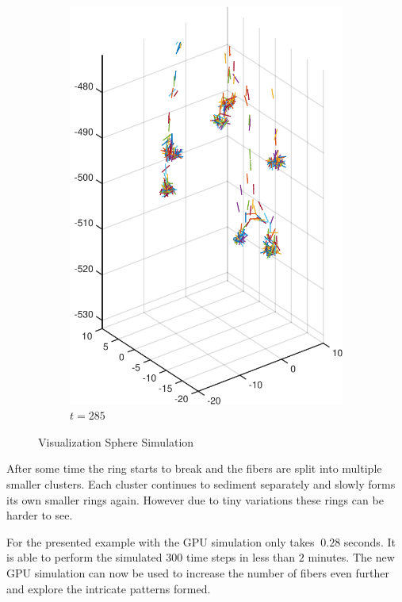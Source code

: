 \documentclass[a4paper,11pt]{kth-mag}
\begin{document}
\begin{figure}[!htbp]
\begin{subfigure}[h]{0.45\textwidth}
    \includegraphics[width=\textwidth]{img/sphere_00250.pdf}
    \caption{$t=285$}\label{fig:sphere_simulation_1d}
  \end{subfigure}
  \caption{Visualization Sphere Simulation}
  \label{fig:sphere_simulation}
\end{figure}

After some time the ring starts to break and the fibers are split into multiple smaller clusters. Each cluster continues to sediment separately and slowly forms its own smaller rings again. However due to tiny variations these rings can be harder to see.

For the presented example with the GPU simulation only takes $~0.28$ seconds. It is able to perform the simulated $300$ time steps in less than $2$ minutes. The new GPU simulation can now be used to increase the number of fibers even further and explore the intricate patterns formed.
\end{document}
